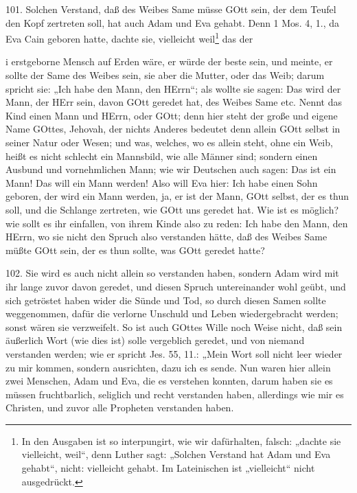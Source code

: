101. Solchen Verstand, daß des Weibes Same müsse GOtt sein, der dem Teufel den Kopf zertreten soll, hat auch Adam und Eva gehabt. Denn 1 Mos. 4, 1., da Eva Cain geboren hatte, dachte sie, vielleicht weil\footnote{In den Ausgaben ist so interpungirt, wie wir dafürhalten, falsch: „dachte sie vielleicht, weil“, denn Luther sagt: „Solchen Verstand hat Adam und Eva gehabt“, nicht: vielleicht gehabt. Im Lateinischen ist „vielleicht“ nicht ausgedrückt.} das der

i
erstgeborne Mensch auf Erden wäre, er würde der beste sein, und meinte, er sollte der Same des Weibes sein, sie aber die Mutter, oder das Weib; darum spricht sie: „Ich habe den Mann, den HErrn“; als wollte sie sagen: Das wird der Mann, der HErr sein, davon GOtt geredet hat, des Weibes Same etc. Nennt das Kind einen Mann und HErrn, oder GOtt; denn hier steht der große und eigene Name GOttes, Jehovah, der nichts Anderes bedeutet denn allein GOtt selbst in seiner Natur oder Wesen; und was, welches, wo es allein steht, ohne ein Weib, heißt es nicht schlecht ein Mannsbild, wie alle Männer sind; sondern einen Ausbund und vornehmlichen Mann; wie wir Deutschen auch sagen: Das ist ein Mann! Das will ein Mann werden! Also will Eva hier: Ich habe einen Sohn geboren, der wird ein Mann werden, ja, er ist der Mann, GOtt selbst, der es thun soll, und die Schlange zertreten, wie GOtt uns geredet hat. Wie ist es möglich? wie sollt es ihr einfallen, von ihrem Kinde also zu reden: Ich habe den Mann, den HErrn, wo sie nicht den Spruch also verstanden hätte, daß des Weibes Same müßte GOtt sein, der es thun sollte, was GOtt geredet hatte?

102. Sie wird es auch nicht allein so verstanden haben, sondern Adam wird mit ihr lange zuvor davon geredet, und diesen Spruch untereinander wohl geübt, und sich getröstet haben wider die Sünde und Tod, so durch diesen Samen sollte weggenommen, dafür die verlorne Unschuld und Leben wiedergebracht werden; sonst wären sie verzweifelt. So ist auch GOttes Wille noch Weise nicht, daß sein äußerlich Wort (wie dies ist) solle vergeblich geredet, und von niemand verstanden werden; wie er spricht Jes. 55, 11.: „Mein Wort soll nicht leer wieder zu mir kommen, sondern ausrichten, dazu ich es sende. Nun waren hier allein zwei Menschen, Adam und Eva, die es verstehen konnten, darum haben sie es müssen fruchtbarlich, seliglich und recht verstanden haben, allerdings wie mir es Christen, und zuvor alle Propheten verstanden haben.

